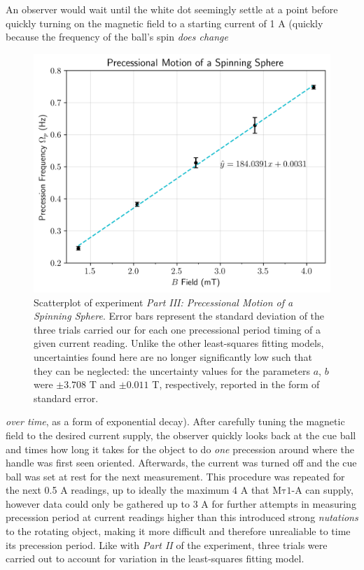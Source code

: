 \documentclass[12pt]{article}
\newcommand{\mtauonea}{\mathrm{M\tau1}\text{-}\mathrm{A}}
\begin{document}
\begin{multicols}{2}
An observer would wait until the white dot seemingly settle at a point before quickly
turning on the magnetic field to a starting current of 1 A
(quickly because the frequency of the ball's spin \textit{does change}
\begin{figure}[H]
    \centering
    \includegraphics[width=0.98\linewidth]{figs/graph3.png}
    \caption{
        Scatterplot of experiment \textit{Part III: Precessional Motion of a Spinning
        Sphere}. Error bars represent the standard deviation of the three trials carried
        our for each one precessional period timing of a given current reading.
        Unlike the other least-squares fitting models, uncertainties found here are no longer significantly low
        such that they can be neglected: the uncertainty values for the parameters $a$, $b$
        were $\pm3.708$ T and $\pm0.011$ T, respectively, reported in the form of standard error.
    }
\end{figure}
\noindent
\textit{over time}, as a form of exponential decay).
After carefully tuning the magnetic field to the desired current supply,
the observer quickly looks back at the cue ball and times how long it takes for the object to do \textit{one} precession
around where the handle was first seen oriented.
Afterwards, the current was turned off and the cue ball was set at rest for the next measurement.
This procedure was repeated for the next 0.5 A readings, up to ideally the maximum 4 A that $\mtauonea$ can supply,
however data could only be gathered up to 3 A for further attempts in measuring precession period at current readings
higher than this introduced strong \textit{nutations} to the rotating object,
making it more difficult and therefore unrealiable to time its precession period.
Like with \textit{Part II} of the experiment, three trials were carried out
to account for variation in the least-squares fitting model.


\end{multicols}
\end{document}
